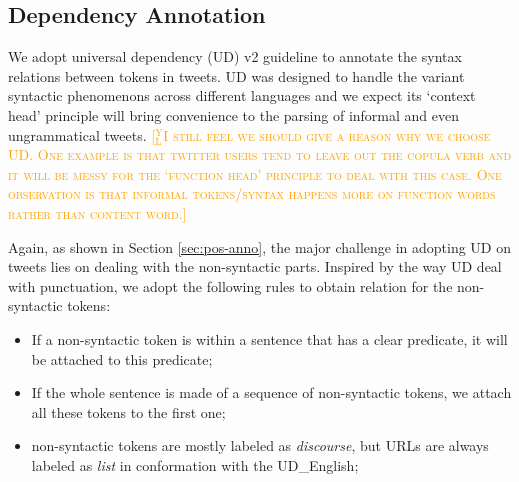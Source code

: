 \documentclass[11pt,letterpaper]{article}
\newcommand{\yjcomment}[1]{\textcolor{orange}{[$_\mathrm{L}^\mathrm{Y}$\textsc{#1}]}}
\begin{document}
\subsection{Dependency Annotation}

We adopt universal dependency (UD) \cite{Marneffe2014UniversalSD} v2 guideline to annotate the syntax relations between tokens in tweets.
UD was designed to handle the variant syntactic phenomenons across different languages and we expect its `context head' principle will bring convenience to the parsing of informal and even ungrammatical tweets. 
\yjcomment{I still feel we should give a reason why we choose UD. One example is that twitter users tend to leave out the copula verb and it will be messy for the `function head' principle to deal with this case. One observation is that informal tokens/syntax happens more on function words rather than content word.}

Again, as shown in Section \ref{sec:pos-anno}, the major challenge in adopting UD on tweets lies on dealing with the non-syntactic parts.
Inspired by the way UD deal with punctuation, we adopt the following rules to obtain relation for the non-syntactic tokens:
\begin{itemize}
\item If a non-syntactic token is within a sentence that has a clear predicate, it will be attached to this predicate;
\item If the whole sentence is made of a sequence of non-syntactic tokens, we attach all these tokens to the first one;
\item non-syntactic tokens are mostly labeled as {\it discourse}, but URLs are always labeled as {\it list} in conformation with the UD\_English;
\end{itemize}
\end{document}

